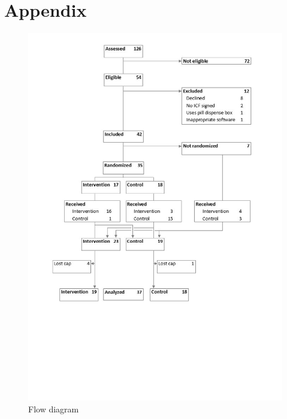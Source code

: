 \documentclass[twocolumn, issue, empirical, authordate]{jote-new-article}
\begin{document}
\section{Appendix}
\begin{figure}[h!]
\label{fig:fig1}
\begin{fullwidth}
\includegraphics[width=\linewidth]{media/media/image1.jpg}
\end{fullwidth}
\caption{Flow diagram}
\end{figure}
\end{document}
